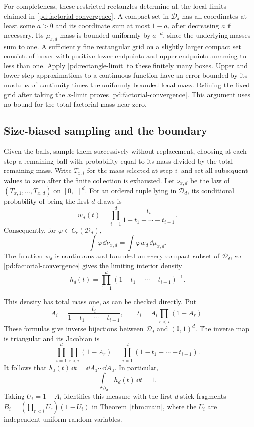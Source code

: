 For completeness, these restricted rectangles determine all the
local limits claimed in \eqref{pd:factorial-convergence}.  A compact
set in $\mathcal D_d$ has all coordinates at least some $a>0$ and
its coordinate sum at most $1-a$, after decreasing $a$ if necessary.
Its $\mu_{x,d}$-mass is bounded uniformly by $a^{-d}$, since the
underlying masses sum to one.  A sufficiently fine rectangular grid
on a slightly larger compact set consists of boxes with positive
lower endpoints and upper endpoints summing to less than one.
Apply \eqref{pd:rectangle-limit} to these finitely many boxes.
Upper and lower step approximations to a continuous function have
an error bounded by its modulus of continuity times the uniformly
bounded local mass.  Refining the fixed grid after taking the
$x$-limit proves \eqref{pd:factorial-convergence}.  This argument
uses no bound for the total factorial mass near zero.

\subsection{Size-biased sampling and the boundary}

Given the balls, sample them successively without replacement,
choosing at each step a remaining ball with probability equal to its
mass divided by the total remaining mass.  Write $T_{x,i}$ for the
mass selected at step $i$, and set all subsequent values to zero
after the finite collection is exhausted.  Let $\nu_{x,d}$ be the
law of $(T_{x,1},\ldots,T_{x,d})$ on $[0,1]^d$.
For an ordered tuple lying in $\mathcal D_d$, its conditional
probability of being the first $d$ draws is
\begin{equation}\label{pd:size-bias-weight}
 w_d(t)=\prod_{i=1}^d
             \frac{t_i}{1-t_1-\cdots-t_{i-1}}.
\end{equation}
Consequently, for $\varphi\in C_c(\mathcal D_d)$,
\[
 \int\varphi\,\dd\nu_{x,d}
 =\int\varphi w_d\,\dd\mu_{x,d}.
\]
The function $w_d$ is continuous and bounded on every compact subset
of $\mathcal D_d$, so \eqref{pd:factorial-convergence} gives the
limiting interior density
\begin{equation}\label{pd:size-bias-density}
 h_d(t)=\prod_{i=1}^d
                   (1-t_1-\cdots-t_{i-1})^{-1}.
\end{equation}

This density has total mass one, as can be checked directly.  Put
\begin{equation}\label{pd:triangular-map}
 A_i=\frac{t_i}{1-t_1-\cdots-t_{i-1}},\qquad
 t_i=A_i\prod_{r<i}(1-A_r).
\end{equation}
These formulas give inverse bijections between $\mathcal D_d$ and
$(0,1)^d$.  The inverse map is triangular and its Jacobian is
\[
 \prod_{i=1}^d\prod_{r<i}(1-A_r)
 =\prod_{i=1}^d(1-t_1-\cdots-t_{i-1}).
\]
It follows that $h_d(t)\,\dd t=\dd A_1\cdots\dd A_d$.
In particular,
\begin{equation}\label{pd:total-mass}
 \int_{\mathcal D_d}h_d(t)\,\dd t=1.
\end{equation}
Taking $U_i=1-A_i$ identifies this measure with the first $d$ stick
fragments $B_i=(\prod_{r<i}U_r)(1-U_i)$ in Theorem~\ref{thm:main},
where the $U_i$ are independent uniform random variables.

